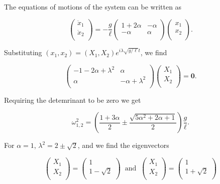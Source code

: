 \documentclass[a4paper,12pt]{report}
\begin{document}
{The equations of motions of the system can be written as 

\begin{equation}
	\begin{pmatrix}
		 \ddot{x}_{1}   \\
		 \ddot{x}_{2}   \\
	\end{pmatrix} = - \frac{g}{\ell } \begin{pmatrix}
		1+2\alpha  & -\alpha   \\
		-\alpha  & \alpha   \\
	\end{pmatrix} \begin{pmatrix}
		 x_1  \\
		 x_2  \\
	\end{pmatrix}.
\end{equation}

Substituting \((x_1 ,x_2 ) = (X_1 ,X_2 )e^{i \lambda \sqrt{g /\ell } t} \), we find 

\begin{equation}
	\begin{pmatrix}
		-1-2\alpha + \lambda ^2 & \alpha   \\
		\alpha  & -\alpha +\lambda ^2  \\
	\end{pmatrix} \begin{pmatrix}
		 X_1  \\
		 X_2  \\
	\end{pmatrix} = \boldsymbol{0} .
\end{equation}

Requiring the detemrinant to be zero we get 

\begin{equation}
	\omega _{1,2}^2 = \left( \frac{1+3 \alpha }{2} \pm \frac{\sqrt{5 \alpha ^2+2\alpha +1} }{2} \right)  \frac{g}{\ell }. 
\end{equation}

For \(\alpha = 1\), \(\lambda ^2 = 2 \pm \sqrt{2} \), and we find the eigenvectors 

\begin{equation}
	\begin{pmatrix}
		 X_1  \\
		 X_2  \\
	\end{pmatrix} = \begin{pmatrix}
		 1 \\
		 1-\sqrt{2}  \\
	\end{pmatrix} ~\text { and }~ \begin{pmatrix}
		 X_1  \\
		 X_2  \\
	\end{pmatrix} = \begin{pmatrix}
		 1 \\
		 1+\sqrt{2}  \\
	\end{pmatrix}
\end{equation}

}
\end{document}
